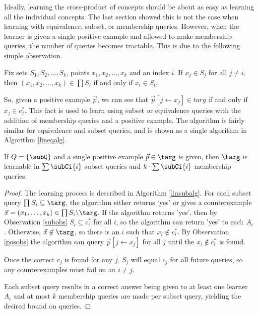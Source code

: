 Ideally, learning the cross-product of concepts should be about as easy as learning all the individual concepts.
The last section showed this is not the case when learning with equivalence, subset, or membership queries.
However, when the learner is given a single positive example and allowed to make membership queries, the number of queries becomes tractable. 
This is due to the following simple observation.

\begin{observation}
\label{posobs}
Fix sets $S_1, S_2, \dots, S_k$, points $x_1, x_2, \dots, x_k$ and an index $i$. 
If $x_j \in S_j$ for all $j \ne i$, then $(x_1, x_2, \dots, x_k) \in \prod S_i$ if and only if $x_i \in S_i$.
\end{observation}

So, given a positive example $\vec{p}$,  we can see that $\vec{p}[j \leftarrow x_j] \in targ$ if and only if $x_j \in c^*_j$.
This fact is used to learn using subset or equivalence queries with the addition of membership queries and a positive example.
The algorithm is fairly similar for equivalence and subset queries, and is shown as a single algorithm in Algorithm \ref{lineqalg}.
 

\begin{proposition}
If $Q = \{\subQ\}$ and a single positive example $\vec{p} \in \targ$ is given, then $\targ$ is learnable in $\sum \subCi{i}$ subset queries and $k \cdot \sum \subCi{i}$ membership queries. 
\end{proposition}
\begin{proof}
The learning process is described in Algorithm \ref{linsubalg}.
For each subset query $\prod S_i \subseteq \targ$, the algorithm either returns `yes' or gives a counterexample $\vec{x} = (x_1, \dots, x_k) \in \prod S_i \backslash \targ$. 
If the algorithm returns 'yes', then by Observation \ref{subobs} $S_i \subseteq c^*_i$ for all $i$, so the algorithm can return 'yes' to each $A_i$. 
Otherwise, $\vec{x} \not\in \targ$, so there is an $i$ such that $x_i \not\in c^*_i$. 
By Observation \ref{posobs} the algorithm can query $\vec{p}[j \leftarrow x_j]$ for all $j$ until the $x_i \not\in c^*_i$ is found. 

Once the correct $c_j$ is found for any $j$, $S_j$ will equal $c_j$ for all future queries, so any counterexamples must fail on an $i \ne j$. 

Each subset query results in a correct answer being given to at least one learner $A_i$ and at most $k$ membership queries are made per subset query, yielding the desired bound on queries. 
\end{proof}

